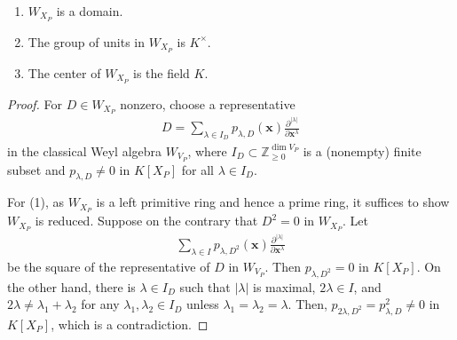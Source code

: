 \documentclass[10pt,a4paper]{amsart}
\newcommand{\zz}{\mathbb Z}
\begin{document}
\begin{Prop}
\begin{enumerate}
    \item $W_{X_P}$ is a domain.
    \item The group of units in $W_{X_P}$ is $K^\times$.
    \item The center of $W_{X_P}$ is the field $K$.
\end{enumerate}
\end{Prop}

\begin{proof}
For $D\in W_{X_P}$ nonzero, choose a representative
\begin{align*}
    D=\sum_{\lambda\in I_D} p_{\lambda,D}(\mathbf{x}) \frac{\partial^{|\lambda|}}{\partial \mathbf{x}^\lambda}
\end{align*}
in the classical Weyl algebra $W_{V_P}$, where $I_D\subset \zz_{\ge 0}^{\dim V_P}$ is a (nonempty) finite subset and $p_{\lambda,D }\neq 0$ in $K[X_P]$ for all $\lambda\in I_D$.

For (1), as $W_{X_P}$ is a left primitive ring and hence a prime ring, it suffices to show $W_{X_P}$ is reduced. Suppose on the contrary that $D^2=0$ in $W_{X_P}$. Let
\begin{align*}
    \sum_{\lambda\in I} p_{\lambda,D^2}(\mathbf{x})\frac{\partial^{|\lambda|}}{\partial \mathbf{x}^\lambda}
\end{align*}
be the square of the representative of $D$ in $W_{V_P}$. Then $p_{\lambda,D^2}=0$ in $K[X_P]$. On the other hand, there is $\lambda\in I_D$ such that $|\lambda|$ is maximal, $2\lambda\in I$, and $2\lambda\neq \lambda_1+\lambda_2$ for any $\lambda_1,\lambda_2\in I_D$ unless $\lambda_1=\lambda_2=\lambda$.
Then, $p_{2\lambda, D^2}=p_{\lambda,D}^2\neq 0$ in $K[X_P]$, which is a contradiction.





\end{proof}
\end{document}
